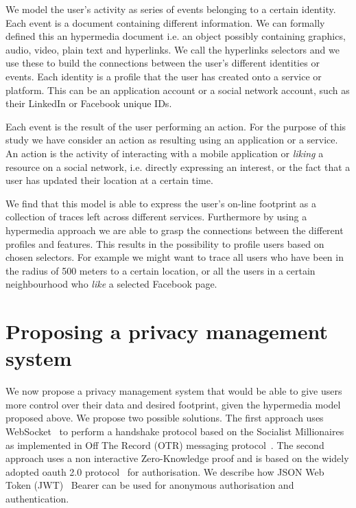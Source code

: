 We model the user's activity as series of events belonging to a certain identity. Each event is a document containing different information. We can formally defined this an hypermedia document i.e. an object possibly containing graphics, audio, video, plain text and hyperlinks. We call the hyperlinks selectors and we use these to build the connections between the user's different identities or events. Each identity is a profile that the user has created onto a service or platform. This can be an application account or a social network account, such as their LinkedIn or Facebook unique IDs.

Each event is the result of the user performing an action. For the purpose of this study we have consider an action as resulting using an application or a service. An action is the activity of interacting with a mobile application or \emph{liking} a resource on a social network, i.e. directly expressing an interest, or the fact that a user has updated their location at a certain time.

We find that this model is able to express the user's on-line footprint as a collection of traces left across different services. Furthermore by using a hypermedia approach we are able to grasp the connections between the different profiles and features. This results in the possibility to profile users based on chosen selectors. For example we might want to trace all users who have been in the radius of 500 meters to a certain location, or all the users in a certain neighbourhood who \emph{like} a selected Facebook page.

\section{Proposing a privacy management system}

We now propose a privacy management system that would be able to give users more control over their data and desired footprint, given the hypermedia model proposed above. We propose two possible solutions. The first approach uses WebSocket~\cite{fetterfc} to perform a handshake protocol based on the Socialist Millionaires as implemented in Off The Record (OTR) messaging protocol~\cite{goldberg2012off}. The second approach uses a non interactive Zero-Knowledge proof and is based on the widely adopted oauth 2.0 protocol~\cite{hardt2012oauth} for authorisation. We describe how JSON Web Token (JWT)~\cite{jones2015json} Bearer can be used for anonymous authorisation and authentication.

